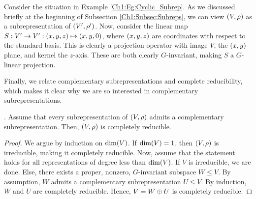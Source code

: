 \begin{boxexample}
    Consider the situation in Example \ref{Ch1:Eg:Cyclic_Subrep}. As we discussed briefly at the beginning of Subsection \ref{Ch1:Subsec:Subreps}, we can view $\left( V, \rho \right)$ as a subrepresentation of $\left( V', \rho' \right)$. Now, consider the linear map $S : V' \to V' : \left( x,y,z \right) \mapsto \left( x,y,0 \right)$, where $\left( x,y,z \right)$ are coordinates with respect to the standard basis. This is clearly a projection operator with image $V$, the $\left( x,y \right)$ plane, and kernel the $z$-axis. These are both clearly $G$-invariant, making $S$ a $G$-linear projection.
\end{boxexample}

Finally, we relate complementary subrepresentations and complete reducibility, which makes it clear why we are so interested in complementary subrepresentations.

\begin{proposition}\label{Ch1:Prop:Compl_Subreps_implies_Comp_Red}
    . Assume that every subrepresentation of $\left( V, \rho \right)$ admits a complementary subrepresentation. Then, $\left( V, \rho \right)$ is completely reducible.
\end{proposition}
\begin{proof}
    We argue by induction on $\dim\!\left( V \right)$. If $\dim\!\left( V \right) = 1$, then $\left( V, \rho \right)$ is irreducible, making it completely reducible. Now, assume that the statement holds for all representations of degree less than $\dim\!\left( V \right)$. If $V$ is irreducible, we are done. Else, there exists a proper, nonzero, $G$-invariant subspace $W \leq V$. By assumption, $W$ admits a complementary subrepresentation $U \leq V$. By induction, $W$ and $U$ are completely reducible. Hence, $V = W \oplus U$ is completely reducible.
\end{proof}

